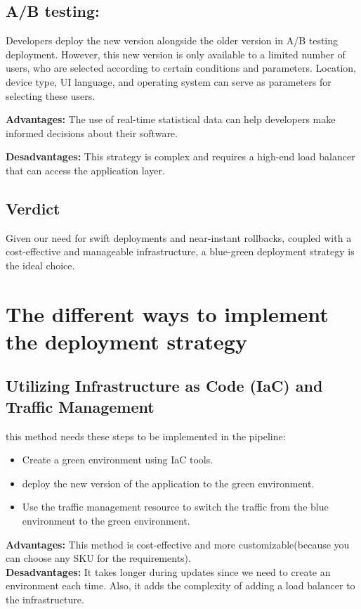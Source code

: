 \subsection*{A/B testing:}
Developers deploy the new version alongside the older version in A/B testing deployment. However, this new version is only available to a limited number of users, who are selected according to certain conditions and parameters. Location, device type, UI language, and operating system can serve as parameters for selecting these users.
\par \noindent \textbf{Advantages:} The use of real-time statistical data can help developers make informed decisions about their software.
\par \noindent \textbf{Desadvantages:} This strategy is complex and requires a high-end load balancer that can access the application layer.

\subsection*{Verdict}
Given our need for swift deployments and near-instant rollbacks, coupled with a cost-effective and manageable infrastructure, a blue-green deployment strategy is the ideal choice.

\section{The different ways to implement the deployment strategy}
\subsection*{Utilizing Infrastructure as Code (IaC) and Traffic Management}
this method needs these steps to be implemented in the pipeline:
\begin{itemize}
    \item Create a green environment using IaC tools.
    \item deploy the new version of the application to the green environment.
    \item Use the traffic management resource to switch the traffic from the blue environment to the green environment.
\end{itemize}
\textbf{Advantages:} This method is cost-effective and more customizable(because you can choose any SKU for the requirements).
\\
\textbf{Desadvantages:} It takes longer during updates since we need to create an environment each time. Also, it adds the complexity of adding a load balancer to the infrastructure.
